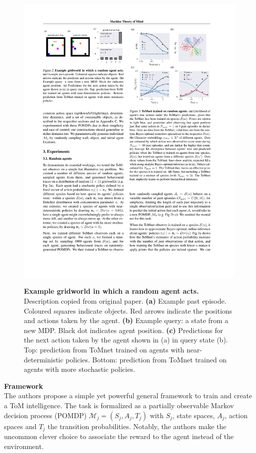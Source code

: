 \documentclass[twocolumn,superscriptaddress,aps]{revtex4-1}
\begin{document}
\begin{figure}[!htb]
\includegraphics[width=\linewidth, height=\textheight, keepaspectratio]{figs/exp1-1}
\label{fig:exp11}
\caption{\textbf{Example gridworld in which a random agent acts.} Description copied from original paper. \textbf{(a)} Example past episode. Coloured squares indicate objects. Red
arrows indicate the positions and actions taken by the agent. \textbf{(b)} Example query: a state from a new MDP. Black dot indicates
agent position. \textbf{(c)} Predictions for the next action taken by the agent shown in (a) in query state (b). Top: prediction from ToMnet trained on agents with near-deterministic policies. Bottom: prediction from ToMnet trained on agents with more stochastic policies.}
\end{figure}

\noindent \textbf{Framework} \\[0.15cm]
The authors propose a simple yet powerful general framework to train and create a ToM intelligence. The task is formalized as a partially observable Markov decision process (POMDP) $\mathcal{M}_j = (S_j,A_j,T_j)$ with $S_j$, state spaces, $A_j$, action spaces and $T_j$ the transition probabilities. Notably, the authors make the uncommon clever choice to associate the reward to the agent instead of the environment.\\
\end{document}

